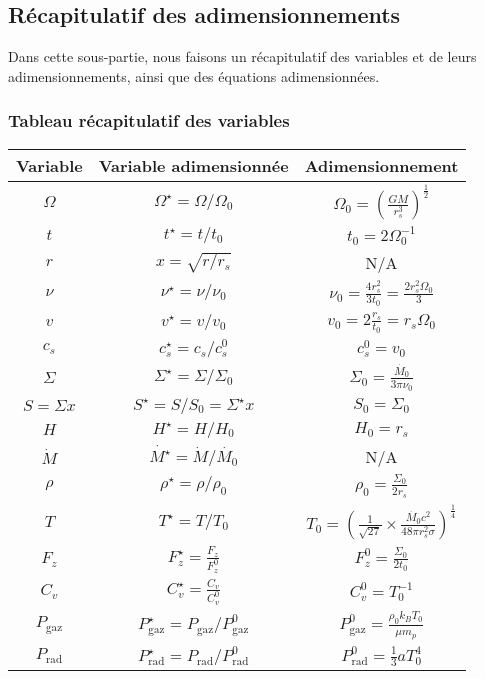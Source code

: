 \subsection{Récapitulatif des adimensionnements}

Dans cette sous-partie, nous faisons un récapitulatif des variables et de leurs
adimensionnements, ainsi que des équations adimensionnées.

\subsubsection{Tableau récapitulatif des variables}

\begin{center}
    \begin{tabular}{|c|c|c|}
        \hline
        Variable & Variable adimensionnée & Adimensionnement \\
        \hline
        $\Omega$ & $\Omega^\star = \Omega/\Omega_0$ & $\Omega_0 = \left( \frac{G M}{r^3_s} \right)^\frac{1}{2}$ \\
        $t$ & $t^\star = t/t_0$ & $t_0 = 2 \Omega_0^{-1}$ \\
        $r$ & $x = \sqrt{r/r_s}$ & N/A \\
        $\nu$ & $\nu^\star = \nu/\nu_0$ & $\nu_0 = \frac{4 r_s^2}{3 t_0} = \frac{2 r_s^2 \Omega_0}{3}$ \\
        $v$ & $v^\star = v/v_0$ & $v_0 = 2 \frac{r_s}{t_0} = r_s \Omega_0$ \\
        $c_s$ & $c_s^\star = c_s/c_s^0$ & $c_s^0 = v_0$ \\
        $\Sigma$ & $\Sigma^\star = \Sigma/\Sigma_0$ & $\Sigma_0 = \frac{\dot{M_0}}{3 \pi \nu_0}$ \\
        $S = \Sigma x$ & $S^\star = S/S_0 = \Sigma^\star x$ & $S_0 = \Sigma_0$ \\
        $H$ & $H^\star = H/H_0$ & $H_0 = r_s$ \\
        $\dot{M}$ & $\dot{M^\star} = \dot{M}/\dot{M_0}$ & N/A \\
        $\rho$ & $\rho^\star = \rho/\rho_0$ & $\rho_0 = \frac{\Sigma_0}{2 r_s}$ \\
        $T$ & $T^\star = T/T_0$ & $T_0 = \left(\frac{1}{\sqrt{27}} \times \frac{\dot{M_0} c^2}{48 \pi r_s^2 \sigma} \right)^\frac{1}{4}$ \\
        $F_z$ & $F_z^\star = \frac{F_z}{F_z^0}$ & $F_z^0 = \frac{\Sigma_0}{2 t_0}$ \\
        $C_v$ & $C_v^\star = \frac{C_v}{C_v^0}$ & $C_v^0 = T_0^{-1}$ \\
        $P_\mathrm{gaz}$ & $P_\mathrm{gaz}^\star = P_\mathrm{gaz}/P_\mathrm{gaz}^0$ & $P_\mathrm{gaz}^0 = \frac{\rho_0 k_B T_0}{\mu m_p}$ \\
        $P_\mathrm{rad}$ & $P_\mathrm{rad}^\star = P_\mathrm{rad}/P_\mathrm{rad}^0$ & $P_\mathrm{rad}^0 = \frac{1}{3} a T_0^4$ \\
        \hline
    \end{tabular}
\end{center}

